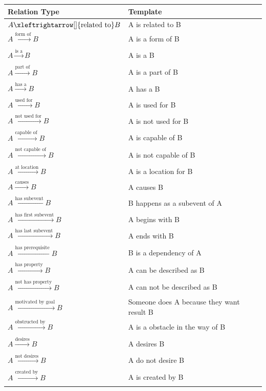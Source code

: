 \begin{table}[!hb] 
    \scriptsize
    \centering
    \setlength{\tabcolsep}{3pt} 
    \begin{tabular}{ll}
    \toprule
    Relation Type & Template \\ 
    \midrule
    $A \xleftrightarrow[]{\text{related to}} B$ & A is related to B \\
    $A \xrightarrow[]{\text{form of}} B$ & A is a form of B \\
    $A \xrightarrow[]{\text{is a}} B$ & A is a B \\
    $A \xrightarrow[]{\text{part of}} B$ & A is a part of B \\
    $A \xrightarrow[]{\text{has a}} B$ & A has a B \\
    $A \xrightarrow[]{\text{used for}} B$ & A is used for B \\
    $A \xrightarrow[]{\text{not used for}} B$ & A is not used for B \\
    $A \xrightarrow[]{\text{capable of}} B$ & A is capable of B \\
    $A \xrightarrow[]{\text{not capable of}} B$ & A is not capable of B \\
    $A \xrightarrow[]{\text{at location}} B$ & A is a location for B \\
    $A \xrightarrow[]{\text{causes}} B$ & A causes B \\
    $A \xleftarrow[]{\text{has subevent}} B$ & B happens as a subevent of A \\
    $A \xrightarrow[]{\text{has first subevent}} B$ & A begins with B \\
    $A \xrightarrow[]{\text{has last subevent}} B$ & A ends with B \\
    $A \xleftarrow[]{\text{has prerequisite}} B$ & B is a dependency of A \\
    $A \xrightarrow[]{\text{has property}} B$ & A can be described as B \\
    $A \xrightarrow[]{\text{not has property}} B$ & A can not be described as B \\
    $A \xrightarrow[]{\text{motivated by goal}} B$ & Someone does A because they want result B \\
    $A \xrightarrow[]{\text{obstructed by}} B$ & A is a obstacle in the way of B \\
    $A \xrightarrow[]{\text{desires}} B$ & A desires B \\
    $A \xrightarrow[]{\text{not desires}} B$ & A do not desire B \\
    $A \xrightarrow[]{\text{created by}} B$ & A is created by B \\

\end{tabular}
\end{table}
